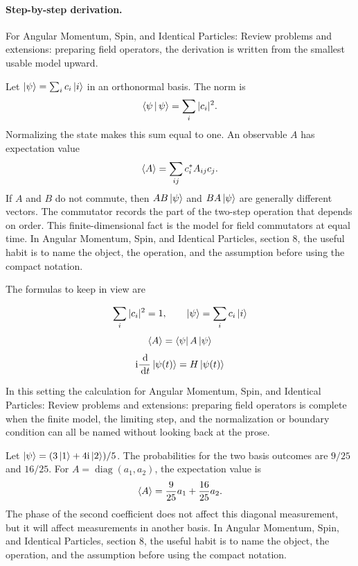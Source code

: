 \paragraph{Step-by-step derivation.}

For Angular Momentum, Spin, and Identical Particles: Review problems and extensions: preparing field operators, the derivation is written from the smallest usable model upward.

Let \(\left|\psi\right\rangle=\sum_i c_i\left|i\right\rangle\) in an orthonormal basis.  The norm is
\[
  \left\langle \psi\,\middle|\,\psi\right\rangle=\sum_i |c_i|^2.
\]
Normalizing the state makes this sum equal to one.  An observable \(A\) has expectation value
\[
  \left\langle A\right\rangle=\sum_{ij}c_i^*A_{ij}c_j.
\]
If \(A\) and \(B\) do not commute, then \(AB\left|\psi\right\rangle\) and \(BA\left|\psi\right\rangle\) are generally different vectors.  The commutator records the part of the two-step operation that depends on order.  This finite-dimensional fact is the model for field commutators at equal time.  In Angular Momentum, Spin, and Identical Particles, section 8, the useful habit is to name the object, the operation, and the assumption before using the compact notation.

The formulas to keep in view are

\[
  \sum_i |c_i|^2=1,\qquad \left|\psi\right\rangle=\sum_i c_i\left|i\right\rangle
\]
\[
  \left\langle A\right\rangle=\left\langle \psi\right|A\left|\psi\right\rangle
\]
\[
  \mathrm i\frac{\,\mathrm d}{\,\mathrm d t}\left|\psi(t)\right\rangle=H\left|\psi(t)\right\rangle
\]

In this setting the calculation for Angular Momentum, Spin, and Identical Particles: Review problems and extensions: preparing field operators is complete when the finite model, the limiting step, and the normalization or boundary condition can all be named without looking back at the prose.




\begin{example}
Let \(\left|\psi\right\rangle=(3\left|1\right\rangle+4\mathrm i\left|2\right\rangle)/5\).  The probabilities for the two basis outcomes are \(9/25\) and \(16/25\).  For \(A=\operatorname{diag}(a_1,a_2)\), the expectation value is
\[
  \left\langle A\right\rangle=\frac{9}{25}a_1+\frac{16}{25}a_2.
\]
The phase of the second coefficient does not affect this diagonal measurement, but it will affect measurements in another basis.  In Angular Momentum, Spin, and Identical Particles, section 8, the useful habit is to name the object, the operation, and the assumption before using the compact notation.
\end{example}



